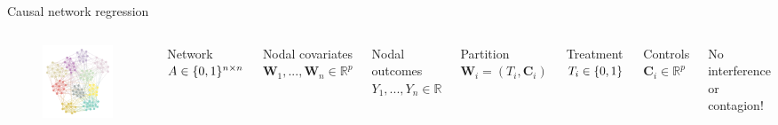 \documentclass{beamer}
\theoremstyle{remark}
\newcommand{\C}{\bm C}
\newcommand{\W}{\bm W}
\newcommand \R {\mathbb{R}}
\DeclarePairedDelimiter{\set}{\{}{\}}
\begin{document}
\begin{frame}{Causal network regression}
    \begin{columns}

        \begin{figure}
            \includegraphics[width=\textwidth]{figures/assortative.png}
        \end{figure}


        Network $A \in \set{0, 1}^{n \times n}$

        Nodal covariates $\W_1, ..., \W_n \in \R^{p}$

        Nodal outcomes $Y_1, ..., Y_n \in \R$

        \vspace{6mm}

        Partition $\W_i = (T_i, \C_i)$

        Treatment $T_i \in \set{0, 1}$

        Controls $\C_i \in \R^p$

        \vspace{6mm}

        No interference or contagion!
    \end{columns}
\end{frame}
\end{document}
